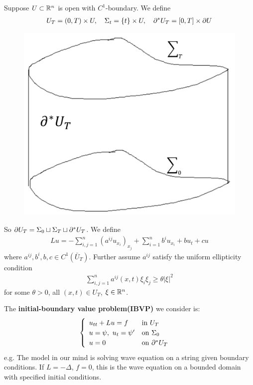 \documentclass[12pt,a4paper]{report}
\begin{document}
Suppose $U\subset \mathbb{R}^n$ is open with $C^1$-boundary. We define 
\begin{align*}
U_T = (0,T)\times U, \quad \Sigma_t = \{t \}\times U , \quad \partial^* U_T = [0,T]\times \partial U
\end{align*}
\begin{figure}[h]
	\begin{center}
		\includegraphics[scale=0.33]{9}
	\end{center}
\end{figure}
So $\partial U_T = \Sigma_0 \sqcup \Sigma_T \sqcup \partial^* U_T$. We define
\begin{align*}
Lu = -\sum_{i,j=1}^n (a^{ij}u_{x_i})_{x_j} + \sum_{i=1}^n b^i u_{x_i} + bu_t + cu
\end{align*}
where $a^{ij}, b^i, b,c \in C^1(\bar{U}_T)$. Further assume $a^{ij}$ satisfy the uniform ellipticity condition
\begin{align*}
\sum_{i,j=1}^n a^{ij}(x,t) \xi_i \xi_j \geq \theta |\xi|^2
\end{align*}
for some $\theta >0$, all $(x,t)\in U_T$, $\xi \in \mathbb{R}^n$.

\quad The \textbf{initial-boundary value problem(IBVP)} we consider is:
\begin{align}
\begin{cases}
\begin{array}{ll}
u_{tt} + Lu = f & \text{in } U_T \\
u = \psi, \,\, u_t = \psi' & \text{on } \Sigma_0\\
u = 0 & \text{on } \partial^* U_T
\end{array}
\end{cases} \label{31}
\end{align}
e.g. The model in our mind is solving wave equation on a string given boundary conditions. If $L = - \Delta$, $f=0$, this is the wave equation on a bounded domain with specified initial conditions.
\s
\end{document}
